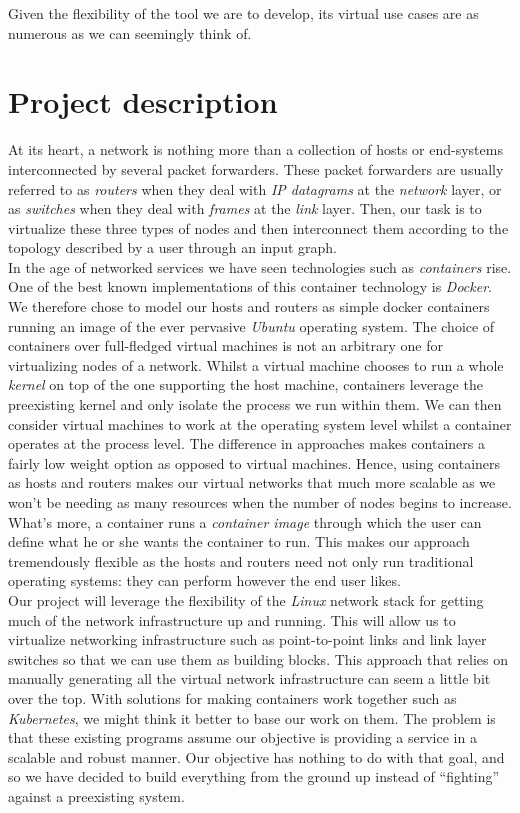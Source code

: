 \documentclass[12pt]{article}
\begin{document}
        Given the flexibility of the tool we are to develop, its virtual use cases are as numerous as we can seemingly think of.\\

    \section{Project description}
        At its heart, a network is nothing more than a collection of hosts or end-systems interconnected by several packet forwarders. These packet forwarders are usually referred to as \textit{routers} when they deal with \textit{IP datagrams} at the \textit{network} layer, or as \textit{switches} when they deal with \textit{frames} at the \textit{link} layer. Then, our task is to virtualize these three types of nodes and then interconnect them according to the topology described by a user through an input graph.\\

        In the age of networked services we have seen technologies such as \textit{containers} rise. One of the best known implementations of this container technology is \textit{Docker}. We therefore chose to model our hosts and routers as simple docker containers running an image of the ever pervasive \textit{Ubuntu} operating system. The choice of containers over full-fledged virtual machines is not an arbitrary one for virtualizing nodes of a network. Whilst a virtual machine chooses to run a whole \textit{kernel} on top of the one supporting the host machine, containers leverage the preexisting kernel and only isolate the process we run within them. We can then consider virtual machines to work at the operating system level whilst a container operates at the process level. The difference in approaches makes containers a fairly low weight option as opposed to virtual machines. Hence, using containers as hosts and routers makes our virtual networks that much more scalable as we won't be needing as many resources when the number of nodes begins to increase. What's more, a container runs a \textit{container image} through which the user can define what he or she wants the container to run. This makes our approach tremendously flexible as the hosts and routers need not only run traditional operating systems: they can perform however the end user likes.\\

        Our project will leverage the flexibility of the \textit{Linux} network stack for getting much of the network infrastructure up and running. This will allow us to virtualize networking infrastructure such as point-to-point links and link layer switches so that we can use them as building blocks. This approach that relies on manually generating all the virtual network infrastructure can seem a little bit over the top. With solutions for making containers work together such as \textit{Kubernetes}, we might think it better to base our work on them. The problem is that these existing programs assume our objective is providing a service in a scalable and robust manner. Our objective has nothing to do with that goal, and so we have decided to build everything from the ground up instead of ``fighting'' against a preexisting system.\\
\end{document}
